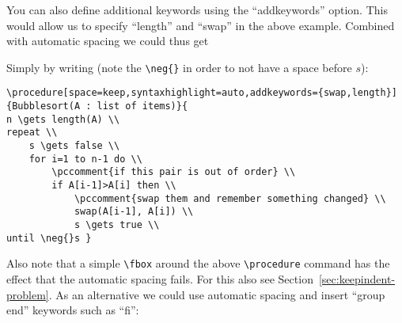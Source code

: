 \documentclass[a4paper]{report}
\begin{document}
You can also define additional keywords using the \enquote{addkeywords} option. This would allow us to specify \enquote{length} and \enquote{swap} in the above example. Combined with automatic spacing we could thus get
\begin{center}
\end{center}
Simply by writing (note the \lstinline$\neg{}$ in order to not have a space before $s$):
\begin{lstlisting}
\procedure[space=keep,syntaxhighlight=auto,addkeywords={swap,length}]{Bubblesort(A : list of items)}{
n \gets length(A) \\
repeat \\
    s \gets false \\
    for i=1 to n-1 do \\
        \pccomment{if this pair is out of order} \\
        if A[i-1]>A[i] then \\
            \pccomment{swap them and remember something changed} \\
            swap(A[i-1], A[i]) \\
            s \gets true \\
until \neg{}s }
\end{lstlisting}
Also note that a simple \lstinline$\fbox$ around the above \lstinline$\procedure$ command has the effect that the automatic spacing fails. 
For this also see Section~\ref{sec:keepindent-problem}. As an alternative we could use automatic spacing and insert \enquote{group end}
keywords such as \enquote{fi}:
\begin{center}
\end{center}
\end{document}
